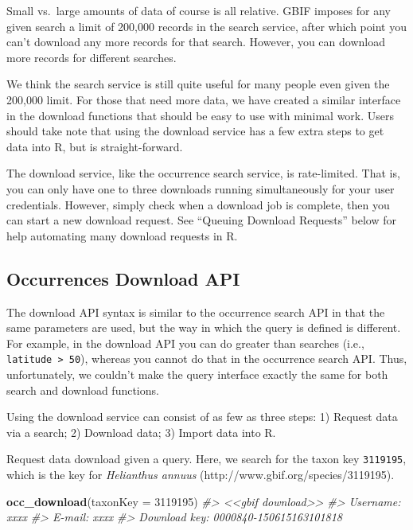 \documentclass[3p]{elsarticle} %
\newenvironment{Shaded}{\begin{snugshade}}{\end{snugshade}}
\newcommand{\CommentTok}[1]{\textcolor[rgb]{0.56,0.35,0.01}{\textit{#1}}}
\newcommand{\KeywordTok}[1]{\textcolor[rgb]{0.13,0.29,0.53}{\textbf{#1}}}
\newcommand{\NormalTok}[1]{#1}
\newcommand{\StringTok}[1]{\textcolor[rgb]{0.31,0.60,0.02}{#1}}
\begin{document}
Small vs.~large amounts of data of course is all relative. GBIF imposes
for any given search a limit of 200,000 records in the search service,
after which point you can't download any more records for that search.
However, you can download more records for different searches.

We think the search service is still quite useful for many people even
given the 200,000 limit. For those that need more data, we have created
a similar interface in the download functions that should be easy to use
with minimal work. Users should take note that using the download
service has a few extra steps to get data into R, but is
straight-forward.

The download service, like the occurrence search service, is
rate-limited. That is, you can only have one to three downloads running
simultaneously for your user credentials. However, simply check when a
download job is complete, then you can start a new download request. See
``Queuing Download Requests'' below for help automating many download
requests in R.

\hypertarget{occurrences-download-api}{%
\subsection{Occurrences Download API}\label{occurrences-download-api}}

The download API syntax is similar to the occurrence search API in that
the same parameters are used, but the way in which the query is defined
is different. For example, in the download API you can do greater than
searches (i.e., \texttt{latitude\ \textgreater{}\ 50}), whereas you
cannot do that in the occurrence search API. Thus, unfortunately, we
couldn't make the query interface exactly the same for both search and
download functions.

Using the download service can consist of as few as three steps: 1)
Request data via a search; 2) Download data; 3) Import data into R.

Request data download given a query. Here, we search for the taxon key
\texttt{3119195}, which is the key for \emph{Helianthus annuus}
(http://www.gbif.org/species/3119195).

\begin{Shaded}
\begin{Highlighting}[]
\KeywordTok{occ\_download}\NormalTok{(}\StringTok{\textquotesingle{}taxonKey = 3119195\textquotesingle{}}\NormalTok{)}
\CommentTok{\#> <<gbif download>>}
\CommentTok{\#>   Username: xxxx}
\CommentTok{\#>   E{-}mail: xxxx}
\CommentTok{\#>   Download key: 0000840{-}150615163101818}
\end{Highlighting}
\end{Shaded}
\end{document}
